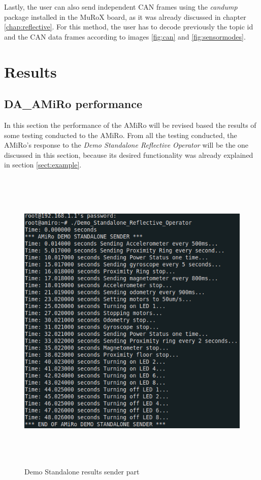 \documentclass[12pt]{report}%
\begin{document}
Lastly, the user can also send independent CAN frames using the \textit{candump} package installed in the MuRoX board, as it was already discussed in chapter \ref{chap:reflective}. For this method, the user has to decode previously the topic id and the CAN data frames according to images \ref{fig:can} and \ref{fig:sensormodes}.

\chapter{Results}
\section{DA\_AMiRo performance}
In this section the performance of the AMiRo will be revised based the results of some testing conducted to the AMiRo. From all the testing conducted, the AMiRo's response to the \textit{Demo Standalone Reflective Operator} will be the one discussed in this section, because its desired functionality was already explained in section \ref{sect:example}.

\begin{figure}[ht]
	\centering
	\includegraphics[width=\textwidth, height=15cm]{standalone_sender}
  	\caption{Demo Standalone results sender part}
  	\label{fig:ressend}
\end{figure}
\end{document}
